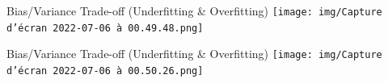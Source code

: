 \documentclass[
  9pt,
  ignorenonframetext,
  aspectratio=169,
  t, dvipsnames]{beamer}
\theoremstyle{definition}
\begin{document}
\begin{frame}{Bias/Variance Trade-off (Underfitting \& Overfitting)}
\protect\hypertarget{biasvariance-trade-off-underfitting-overfitting}{}
\texttt{[image: img/Capture d’écran 2022-07-06 à 00.49.48.png]}
\end{frame}

\begin{frame}{Bias/Variance Trade-off (Underfitting \& Overfitting)}
\protect\hypertarget{biasvariance-trade-off-underfitting-overfitting-1}{}
\texttt{[image: img/Capture d’écran 2022-07-06 à 00.50.26.png]}
\end{frame}
\end{document}
